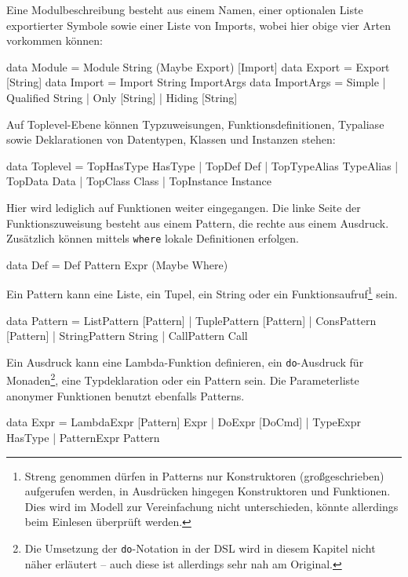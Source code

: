 \documentclass[12pt, a4paper, bibgerm]{scrbook}
\newenvironment{DIFnomarkup}{}{}
\newcommand\icode[1]{\lstinline?#1?}
\begin{document}
Eine Modulbeschreibung besteht aus einem Namen, einer optionalen Liste
exportierter Symbole sowie einer Liste von Imports, wobei hier obige
vier Arten vorkommen können:
\begin{DIFnomarkup}\begin{code}
data Module = Module String (Maybe Export) [Import]
data Export = Export [String]
data Import = Import String ImportArgs
data ImportArgs = Simple
                | Qualified String
                | Only [String]
                | Hiding [String]
\end{code}\end{DIFnomarkup}
Auf Toplevel-Ebene können Typzuweisungen, Funktionsdefinitionen,
Typaliase sowie Deklarationen von Datentypen, Klassen und Instanzen stehen:
\begin{DIFnomarkup}\begin{code}
data Toplevel = TopHasType HasType
              | TopDef Def
              | TopTypeAlias TypeAlias
              | TopData Data
              | TopClass Class
              | TopInstance Instance
\end{code}\end{DIFnomarkup}
Hier wird lediglich auf Funktionen weiter eingegangen. Die linke Seite der
Funktionszuweisung besteht aus einem Pattern, die rechte aus einem
Ausdruck. Zusätzlich können mittels \icode{where} lokale Definitionen
erfolgen.
\begin{DIFnomarkup}\begin{code}
data Def = Def Pattern Expr (Maybe Where)
\end{code}\end{DIFnomarkup}
Ein Pattern kann eine Liste, ein Tupel, ein String oder ein
Funktionsaufruf\footnote{Streng genommen dürfen in Patterns nur
  Konstruktoren (großgeschrieben) aufgerufen werden, in Ausdrücken
  hingegen Konstruktoren und Funktionen. Dies wird im Modell zur
  Vereinfachung nicht unterschieden, könnte allerdings beim Einlesen
  überprüft werden.} sein.
\begin{DIFnomarkup}\begin{code}
data Pattern = ListPattern [Pattern]
             | TuplePattern [Pattern]
             | ConsPattern [Pattern]
             | StringPattern String
             | CallPattern Call
\end{code}\end{DIFnomarkup}
Ein Ausdruck kann eine Lambda-Funktion definieren, ein
\icode{do}-Ausdruck für Monaden\footnote{Die Umsetzung der
  \icode{do}-Notation in der DSL wird in diesem Kapitel nicht
  näher erläutert -- auch diese ist allerdings sehr nah am
  Original.}, eine Typdeklaration oder ein Pattern sein. Die
Parameterliste anonymer Funktionen benutzt ebenfalls Patterns.
\begin{DIFnomarkup}\begin{code}
data Expr = LambdaExpr  [Pattern] Expr
          | DoExpr      [DoCmd]
          | TypeExpr    HasType
          | PatternExpr Pattern
\end{code}\end{DIFnomarkup}
\end{document}
